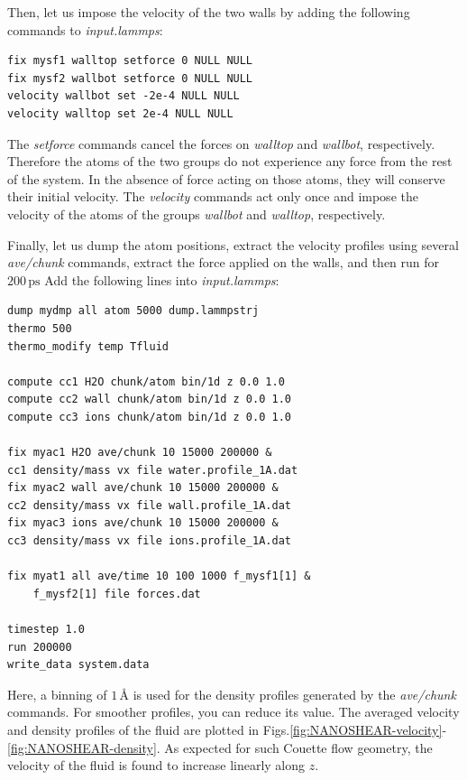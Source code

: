 \documentclass[9pt,tutorial]{livecoms}
\begin{document}
Then, let us impose the velocity of the two walls by adding the following commands to \textit{input.lammps}:
{\normalsize \begin{verbatim}
fix mysf1 walltop setforce 0 NULL NULL
fix mysf2 wallbot setforce 0 NULL NULL
velocity wallbot set -2e-4 NULL NULL
velocity walltop set 2e-4 NULL NULL
\end{verbatim}}
The \textit{setforce} commands cancel the forces on \textit{walltop} and \textit{wallbot}, respectively. Therefore the atoms of the two groups do not experience any force from the rest of the system. In the absence of force acting on those atoms, they will conserve their initial velocity. The \textit{velocity} commands act only once and impose the velocity of the atoms of the groups \textit{wallbot} and \textit{walltop}, respectively.

Finally, let us dump the atom positions, extract the velocity profiles using several \textit{ave/chunk} commands, extract the
force applied on the walls, and then run for $200\,\text{ps}$ Add the following lines into \textit{input.lammps}:
{\normalsize \begin{verbatim}
dump mydmp all atom 5000 dump.lammpstrj
thermo 500
thermo_modify temp Tfluid

compute cc1 H2O chunk/atom bin/1d z 0.0 1.0
compute cc2 wall chunk/atom bin/1d z 0.0 1.0
compute cc3 ions chunk/atom bin/1d z 0.0 1.0

fix myac1 H2O ave/chunk 10 15000 200000 &
cc1 density/mass vx file water.profile_1A.dat
fix myac2 wall ave/chunk 10 15000 200000 &
cc2 density/mass vx file wall.profile_1A.dat
fix myac3 ions ave/chunk 10 15000 200000 &
cc3 density/mass vx file ions.profile_1A.dat

fix myat1 all ave/time 10 100 1000 f_mysf1[1] &
    f_mysf2[1] file forces.dat

timestep 1.0
run 200000
write_data system.data
\end{verbatim}}
Here, a binning of $1\,\text{Å}$ is used for the density profiles generated by the \textit{ave/chunk} commands. For smoother profiles, you can reduce its value. The averaged velocity and density profiles of the fluid are plotted in Figs.\ref{fig:NANOSHEAR-velocity}-\ref{fig:NANOSHEAR-density}. As expected for such Couette flow geometry, the velocity of the fluid is found to increase linearly along $z$.
\end{document}
